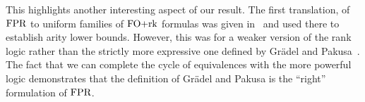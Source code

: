 \documentclass[../paper.tex]{subfiles}
\begin{document}
This highlights another interesting aspect of our result.  The first
translation, of $\text{\upshape FPR}$ to uniform families of $\text{\upshape FO+rk}$ formulas was
given in~\cite{Dawar09logicswith} and used there to establish arity
lower bounds.  However, this was for a weaker version of the rank
logic rather than the strictly more expressive one defined by
Gr\"{a}del and Pakusa~\cite{GradelP15a}.  The fact that we can
complete the cycle of equivalences with the more powerful logic
demonstrates that the definition of Gr\"{a}del and Pakusa is the
``right'' formulation of $\text{\upshape FPR}$.



\end{document}
